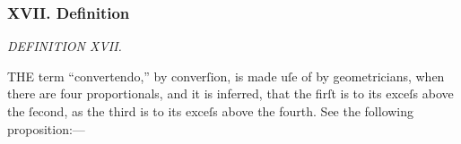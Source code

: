 \documentclass[12pt,preview]{standalone}
\begin{document}
\subsubsection{XVII. Definition}

\begin{minipage}{\textwidth}

    \begin{center}
        \textit{DEFINITION XVII.}\label{book5def17} \\
    \end{center}

    \hfill

    \raggedright T\textsc{HE} term “convertendo,” by converſion, is made uſe of by geometricians, when there are four proportionals, and it is inferred, that the firſt is to its exceſs above the ſecond, as the third is to its exceſs above the fourth. See the following proposition:---

    \hfill

\end{minipage}
\end{document}
